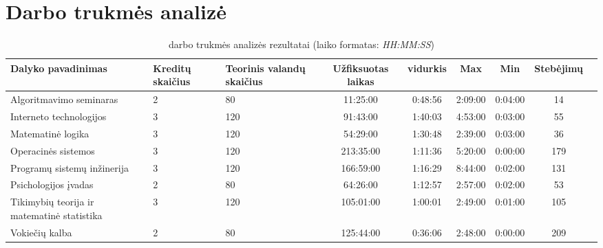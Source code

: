 \chapter{Darbo trukmės analizė}

\begin{sidewaystable}
\centering
\begin{tabular}{|l|p{50pt}|p{50pt}|c|c|c|c|c|c|}
  \hline
  {\bf Dalyko pavadinimas} & {\bf Kreditų skaičius} & {\bf Teorinis valandų skaičius} & {\bf Užfiksuotas laikas} & {\bf vidurkis } & {\bf Max} & {\bf Min} & {\bf Stebėjimų}  \\
  \hline
  Algoritmavimo seminaras & 2 & 80 & 11:25:00 & 0:48:56 & 2:09:00 & 0:04:00 & 14 \\
  \hline
  Interneto technologijos & 3 & 120 & 91:43:00 & 1:40:03 & 4:53:00 & 0:03:00 & 55 \\
  \hline
  Matematinė logika & 3 & 120 & 54:29:00  & 1:30:48 & 2:39:00 & 0:03:00 & 36 \\
  \hline
  Operacinės sistemos & 3 & 120 & 213:35:00 & 1:11:36 & 5:20:00 & 0:00:00 & 179 \\
  \hline
  Programų sistemų inžinerija & 3 & 120 & 166:59:00 & 1:16:29 & 8:44:00 & 0:02:00 & 131 \\
  \hline
  Psichologijos įvadas & 2 & 80 & 64:26:00 & 1:12:57 & 2:57:00 & 0:02:00 & 53 \\
  \hline
  Tikimybių teorija ir matematinė statistika & 3 & 120 & 105:01:00 & 1:00:01 & 2:49:00 & 0:01:00 & 105 \\
  \hline
  Vokiečių kalba & 2 & 80 & 125:44:00 & 0:36:06 & 2:48:00 & 0:00:00 & 209 \\
  \hline
\end{tabular}
\caption{darbo trukmės analizės rezultatai (laiko formatas:
  \emph{HH:MM:SS})}
\end{sidewaystable}

